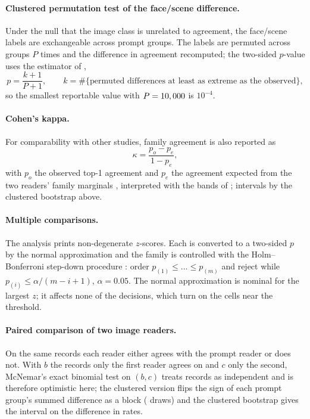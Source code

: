 \paragraph{Clustered permutation test of the face/scene difference.} Under the null that the image class is unrelated to agreement, the face/scene labels are exchangeable across prompt groups. The labels are permuted across groups $P$ times and the difference in agreement recomputed; the two-sided $p$-value uses the estimator of \cite{north2002note},
\begin{equation}
p = \frac{k + 1}{P + 1}, \qquad k = \#\{\text{permuted differences at least as extreme as the observed}\},
\label{eq:permp}
\end{equation}
so the smallest reportable value with $P = 10,000$ is $10^{-4}$.

\paragraph{Cohen's kappa.} For comparability with other studies, family agreement is also reported as
\begin{equation}
\kappa = \frac{p_o - p_e}{1 - p_e},
\label{eq:kappa}
\end{equation}
with $p_o$ the observed top-1 agreement and $p_e$ the agreement expected from the two readers' family marginals \cite{cohen1960coefficient}, interpreted with the bands of \cite{landis1977measurement}; intervals by the clustered bootstrap above.

\paragraph{Multiple comparisons.} The analysis prints \HolmM{} non-degenerate $z$-scores. Each is converted to a two-sided $p$ by the normal approximation and the family is controlled with the Holm--Bonferroni step-down procedure \cite{holm1979simple}: order $p_{(1)} \le \dots \le p_{(m)}$ and reject while $p_{(i)} \le \alpha / (m - i + 1)$, $\alpha = 0.05$. The normal approximation is nominal for the largest $z$; it affects none of the decisions, which turn on the cells near the threshold.

\paragraph{Paired comparison of two image readers.} On the same records each reader either agrees with the prompt reader or does not. With $b$ the records only the first reader agrees on and $c$ only the second, McNemar's exact binomial test \cite{mcnemar1947note} on $(b, c)$ treats records as independent and is therefore optimistic here; the clustered version flips the sign of each prompt group's summed difference as a block (\McClusterDraws{} draws) and the clustered bootstrap gives the interval on the difference in rates.

